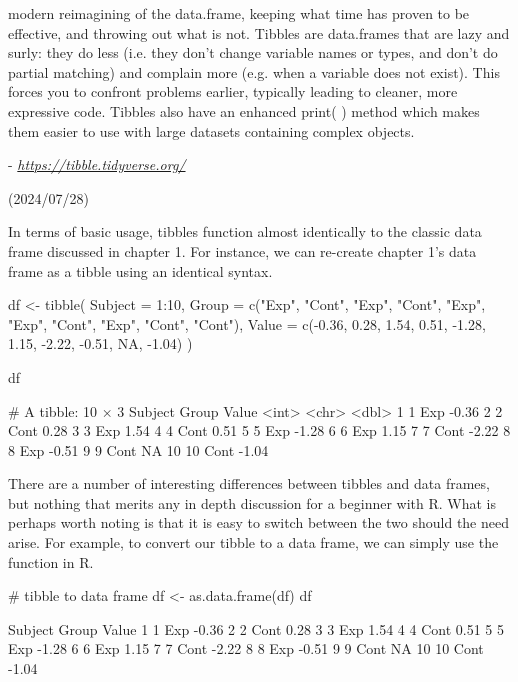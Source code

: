 \begin{displayquote}
modern reimagining of the data.frame, keeping what time has proven to be effective, and throwing out what is not. Tibbles are data.frames that are lazy and surly: they do less (i.e. they don’t change variable names or types, and don’t do partial matching) and complain more (e.g. when a variable does not exist). This forces you to confront problems earlier, typically leading to cleaner, more expressive code. Tibbles also have an enhanced print( ) method which makes them easier to use with large datasets containing complex objects.

- \textit{\url{https://tibble.tidyverse.org/}}

\vspace{-1em}
(2024/07/28)

\end{displayquote}

In terms of basic usage, tibbles function almost identically to the classic data frame discussed in chapter 1. For instance, we can re-create chapter 1's data frame as a tibble using an identical syntax.

\begin{inR}
df <- tibble(
  Subject = 1:10,
  Group = c("Exp", "Cont", "Exp", "Cont", "Exp", "Exp",
            "Cont", "Exp", "Cont", "Cont"),
  Value = c(-0.36,  0.28,  1.54,  0.51, -1.28,  1.15,
            -2.22, -0.51,  NA, -1.04)
)

df
\end{inR}

\begin{outR}
# A tibble: 10 × 3
   Subject Group Value
     <int> <chr> <dbl>
 1       1 Exp   -0.36
 2       2 Cont   0.28
 3       3 Exp    1.54
 4       4 Cont   0.51
 5       5 Exp   -1.28
 6       6 Exp    1.15
 7       7 Cont  -2.22
 8       8 Exp   -0.51
 9       9 Cont  NA   
10      10 Cont  -1.04
\end{outR}

\noindent
There are a number of interesting differences between tibbles and data frames, but nothing that merits any in depth discussion for a beginner with R. What is perhaps worth noting is that it is easy to switch between the two should the need arise. For example, to convert our tibble  to a data frame, we can simply use the  function in R.

\begin{inR}
# tibble to data frame
df <- as.data.frame(df)
df
\end{inR}
\begin{outR}
   Subject Group Value
1        1   Exp -0.36
2        2  Cont  0.28
3        3   Exp  1.54
4        4  Cont  0.51
5        5   Exp -1.28
6        6   Exp  1.15
7        7  Cont -2.22
8        8   Exp -0.51
9        9  Cont    NA
10      10  Cont -1.04
\end{outR}

